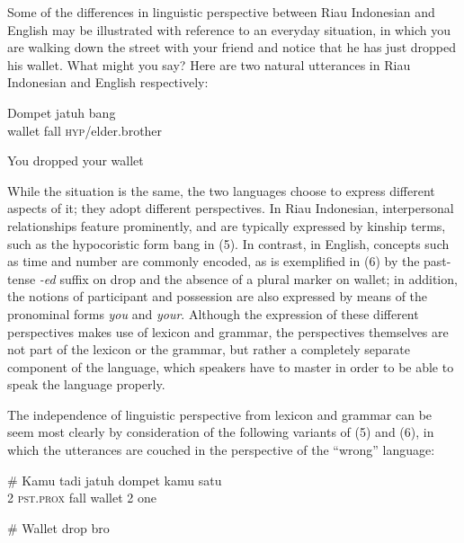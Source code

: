 \documentclass[output=paper,colorlinks,citecolor=brown
]{langscibook}
\begin{document}
Some of the differences in linguistic perspective between Riau Indonesian and English may be illustrated with reference to an everyday situation, in which you are walking down the street with your friend and notice that he has just dropped his wallet.  What might you say?  Here are two natural utterances in Riau Indonesian and English respectively:

\ea
\gll Dompet	jatuh	bang \\
    wallet	fall	\textsc{hyp}/elder.brother \\
\z

\ea
You dropped your wallet \\
\z

While the situation is the same, the two languages choose to express different aspects of it; they adopt different perspectives. In Riau Indonesian, interpersonal relationships feature prominently, and are typically expressed by kinship terms, such as the hypocoristic form bang in (5).  In contrast, in English, concepts such as time and number are commonly encoded, as is exemplified in (6) by the past-tense \emph{-ed} suffix on drop and the absence of a plural marker on wallet; in addition, the notions of participant and possession are also expressed by means of the pronominal forms \emph{you} and \emph{your}. Although the expression of these different perspectives makes use of lexicon and grammar, the perspectives themselves are not part of the lexicon or the grammar, but rather a completely separate component of the language, which speakers have to master in order to be able to speak the language properly.  

The independence of linguistic perspective from lexicon and grammar can be seem most clearly by consideration of the following variants of (5) and (6), in which the utterances are couched in the perspective of the ``wrong'' language:

\ea
\gll \# Kamu	tadi	jatuh	dompet	kamu	satu \\
    { } 2	\textsc{pst.prox}	fall	wallet	2	one \\
\z

\ea
\# Wallet drop bro \\
\z
\end{document}
